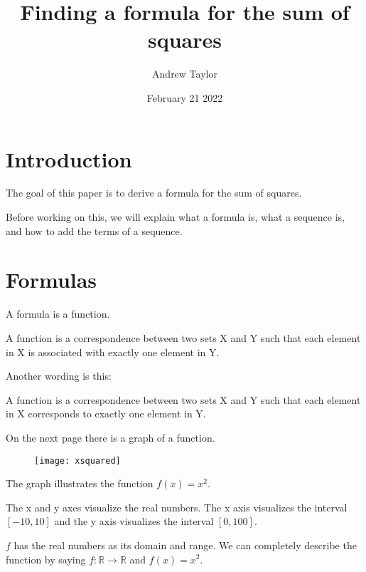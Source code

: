 \documentclass{article}
\title{Finding a formula for the sum of squares}
\author{Andrew Taylor}
\date{February 21 2022}
\begin{document}
\maketitle
\section{Introduction}
\begin{flushleft}
The goal of this paper is to derive a formula for the sum of squares. 
\end{flushleft}
\begin{flushleft}
Before working on this, we will explain what a formula is, what a sequence is, and how to add the terms of a sequence.
\end{flushleft}
\section{Formulas}
\begin{flushleft}
A formula is a function.
\end{flushleft}
\begin{flushleft}
A function is a correspondence between two sets X and Y such that each element in X is associated with exactly one element in Y.
\end{flushleft}
\begin{flushleft}
Another wording is this:
\end{flushleft}
\begin{flushleft}
A function is a correspondence between two sets X and Y such that each element in X corresponds to exactly one element in Y.
\end{flushleft}
\begin{flushleft}
On the next page there is a graph of a function.
\end{flushleft}
\begin{figure}
\centering
\texttt{[image: xsquared]}
\end{figure}
\clearpage
\begin{flushleft}
The graph illustrates the function $f(x) = x^2$. 
\end{flushleft}
\begin{flushleft}
The x and y axes visualize the real numbers. The x axis visualizes the interval $[-10, 10]$ and the y axis visualizes the interval $[0, 100]$.
\end{flushleft}
\begin{flushleft}
$f$ has the real numbers as its domain and range. We can completely describe the function by saying $f : \mathbb{R} \rightarrow \mathbb{R}$ and $f(x) = x^2$.
\end{flushleft}
\end{document}
